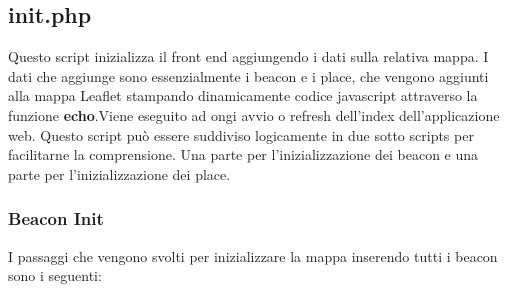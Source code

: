 \subsection{init.php}
Questo script inizializza il front end aggiungendo i dati sulla relativa mappa. I dati che aggiunge sono essenzialmente i beacon e i place, che vengono aggiunti alla mappa Leaflet stampando dinamicamente codice javascript attraverso la funzione \textbf{echo}.\newline Viene eseguito ad ongi avvio o refresh dell'index dell'applicazione web.
\newline
Questo script può essere suddiviso logicamente in due sotto scripts per facilitarne la comprensione. Una parte per l'inizializzazione dei beacon e una parte per l'inizializzazione dei place.
\subsubsection{Beacon Init}
I passaggi che vengono svolti per inizializzare la mappa inserendo tutti i beacon sono i seguenti:
